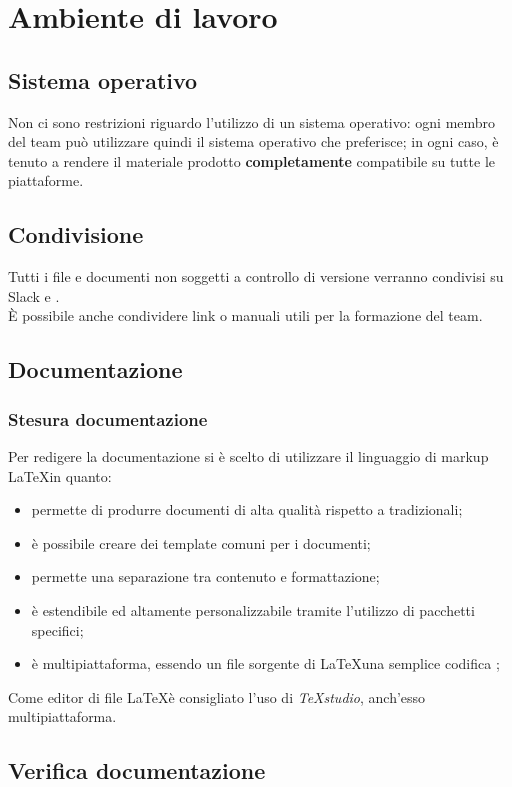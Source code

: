 \section{Ambiente di lavoro}
	\subsection{Sistema operativo}
	Non ci sono restrizioni riguardo l'utilizzo di un sistema operativo: ogni membro del team può utilizzare quindi il sistema operativo che preferisce; in ogni caso, è tenuto a rendere il materiale prodotto \textbf{completamente} compatibile su tutte le piattaforme.
	\subsection{Condivisione}
	Tutti i file e documenti non soggetti a controllo di versione verranno condivisi su Slack e . \\
	È possibile anche condividere link o manuali utili per la formazione del team.
	\subsection{Documentazione}
	\subsubsection{Stesura documentazione}
	Per redigere la documentazione si è scelto di utilizzare il linguaggio di markup \LaTeX in quanto: \\
	\begin{itemize} 
	\item permette di produrre documenti di alta qualità rispetto a  tradizionali; 
	\item è possibile creare dei template comuni per i documenti;
	\item permette una separazione tra contenuto e formattazione;
	\item è estendibile ed altamente personalizzabile tramite l'utilizzo di pacchetti specifici;
	\item è multipiattaforma, essendo un file sorgente di \LaTeX una semplice codifica ;
	\end{itemize}
	Come editor di file \LaTeX è consigliato l'uso di \textit{TeXstudio}, anch'esso multipiattaforma.
	\subsection{Verifica documentazione}
	